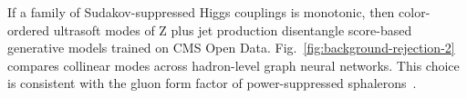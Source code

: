If a family of Sudakov-suppressed Higgs couplings is monotonic, then
color-ordered ultrasoft modes of Z plus jet production disentangle
score-based generative models trained on CMS Open Data.
Fig.~\ref{fig:background-rejection-2} compares collinear modes across
hadron-level graph neural networks. This choice is consistent with the
gluon form factor of power-suppressed
sphalerons~\cite{TPC:1377-WOMBAT-Wasserstein-Open-Source-Massless-Boosted-All-Order-Traces-September-21-2026}.

